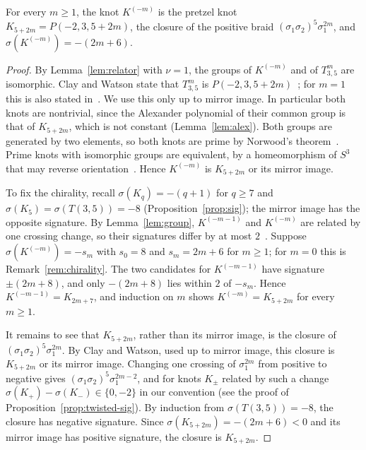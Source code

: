 \begin{theorem}\label{thm:topology}
For every $m\ge1$, the knot $K^{(-m)}$ is the pretzel knot $K_{5+2m}=P(-2,3,5+2m)$, the closure of the positive braid
$(\sigma_1\sigma_2)^5\sigma_1^{2m}$, and $\sigma(K^{(-m)})=-(2m+6)$.
\end{theorem}

\begin{proof}
By Lemma~\ref{lem:relator} with $\nu=1$, the groups of $K^{(-m)}$ and of $T^m_{3,5}$ are isomorphic. Clay and Watson state
that $T^m_{3,5}$ is $P(-2,3,5+2m)$~\cite[\S3.2]{ClayWatson}; for $m=1$ this is also stated in~\cite[p.~164]{DS24}. We use
this only up to mirror image. In particular both knots are nontrivial, since the Alexander polynomial of their common
group is that of $K_{5+2m}$, which is not constant (Lemma~\ref{lem:alex}). Both groups are generated by two elements, so
both knots are prime by Norwood's theorem~\cite{Norwood}. Prime knots with isomorphic groups are equivalent, by a
homeomorphism of $S^3$ that may reverse orientation~\cite[Cor.~2.1]{GordonLuecke}. Hence $K^{(-m)}$ is $K_{5+2m}$ or its
mirror image.

To fix the chirality, recall $\sigma(K_q)=-(q+1)$ for $q\ge7$ and $\sigma(K_5)=\sigma(T(3,5))=-8$
(Proposition~\ref{prop:sig}); the mirror image has the opposite signature. By Lemma~\ref{lem:group}, $K^{(-m-1)}$ and
$K^{(-m)}$ are related by one crossing change, so their signatures differ by at most $2$~\cite[proof of Thm.~10.1, (10.2)]{Murasugi}.
Suppose $\sigma(K^{(-m)})=-s_m$ with $s_0=8$ and $s_m=2m+6$ for $m\ge1$; for $m=0$ this is Remark~\ref{rem:chirality}.
The two candidates for $K^{(-m-1)}$ have signature $\pm(2m+8)$, and only $-(2m+8)$ lies within $2$ of $-s_m$. Hence
$K^{(-m-1)}=K_{2m+7}$, and induction on $m$ shows $K^{(-m)}=K_{5+2m}$ for every $m\ge1$.

It remains to see that $K_{5+2m}$, rather than its mirror image, is the closure of $(\sigma_1\sigma_2)^5\sigma_1^{2m}$. By
Clay and Watson, used up to mirror image, this closure is $K_{5+2m}$ or its mirror image. Changing one crossing of
$\sigma_1^{2m}$ from positive to negative gives $(\sigma_1\sigma_2)^5\sigma_1^{2m-2}$, and for knots $K_\pm$
related by such a change $\sigma(K_+)-\sigma(K_-)\in\{0,-2\}$ in our convention (see the proof of
Proposition~\ref{prop:twisted-sig}). By induction from $\sigma(T(3,5))=-8$, the closure has negative signature. Since
$\sigma(K_{5+2m})=-(2m+6)<0$ and its mirror image has positive signature, the closure is $K_{5+2m}$.
\end{proof}

